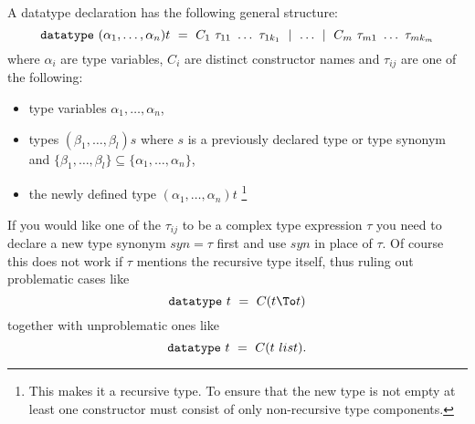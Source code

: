 A datatype declaration has the following general structure:
\[ \mbox{\tt datatype}~ (\alpha_1,\dots,\alpha_n)t ~=~
      C_1~\tau_{11}~\dots~\tau_{1k_1} ~\mid~ \dots ~\mid~
      C_m~\tau_{m1}~\dots~\tau_{mk_m} 
\]
where $\alpha_i$ are type variables, $C_i$ are distinct constructor names and
$\tau_{ij}$ are one of the following:
\begin{itemize}
\item type variables $\alpha_1,\dots,\alpha_n$,
\item types $(\beta_1,\dots,\beta_l)s$ where $s$ is a previously declared
  type or type synonym and $\{\beta_1,\dots,\beta_l\} \subseteq
  \{\alpha_1,\dots,\alpha_n\}$,
\item the newly defined type $(\alpha_1,\dots,\alpha_n)t$ \footnote{This
    makes it a recursive type. To ensure that the new type is not empty at
    least one constructor must consist of only non-recursive type
    components.}
\end{itemize}
If you would like one of the $\tau_{ij}$ to be a complex type expression
$\tau$ you need to declare a new type synonym $syn = \tau$ first and use
$syn$ in place of $\tau$. Of course this does not work if $\tau$ mentions the
recursive type itself, thus ruling out problematic cases like \[ \mbox{\tt
  datatype}~ t ~=~ C(t \To t) \] together with unproblematic ones like \[
\mbox{\tt datatype}~ t ~=~ C(t~list). \]

